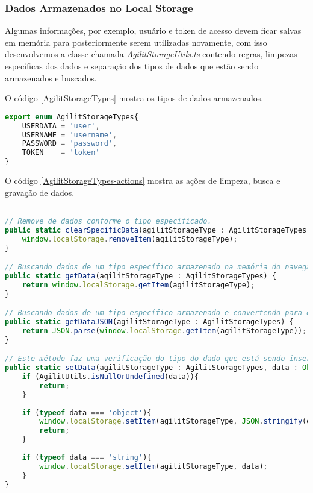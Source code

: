 \subsubsection{Dados Armazenados no Local Storage}
Algumas informações, por exemplo, usuário e token de acesso devem ficar salvas em memória para posteriormente serem utilizadas novamente, com isso desenvolvemos a classe chamada \textit{AgilitStorageUtils.ts} contendo regras, limpezas específicas dos dados e separação dos tipos de dados que estão sendo armazenados e buscados.

O código \ref{AgilitStorageTypes} mostra os tipos de dados armazenados.
\begin{lstlisting}[language=JavaScript, caption={Tipos de dados armazenados}, label={AgilitStorageTypes}]
export enum AgilitStorageTypes{
	USERDATA = 'user',
	USERNAME = 'username',
	PASSWORD = 'password',
	TOKEN    = 'token'
}
\end{lstlisting}

O código \ref{AgilitStorageTypes-actions} mostra as ações de limpeza, busca e gravação de dados.

\begin{lstlisting}[language=JavaScript, caption={Tipos de dados armazenados}, label={AgilitStorageTypes-actions}]

// Remove de dados conforme o tipo especificado.
public static clearSpecificData(agilitStorageType : AgilitStorageTypes) {
	window.localStorage.removeItem(agilitStorageType);
}

// Buscando dados de um tipo específico armazenado na memória do navegador.
public static getData(agilitStorageType : AgilitStorageTypes) {
	return window.localStorage.getItem(agilitStorageType);
}

// Buscando dados de um tipo específico armazenado e convertendo para objeto.
public static getDataJSON(agilitStorageType : AgilitStorageTypes) {
	return JSON.parse(window.localStorage.getItem(agilitStorageType));
}

// Este método faz uma verificação do tipo do dado que está sendo inserido na memória do navegador.
public static setData(agilitStorageType : AgilitStorageTypes, data : Object|Array<any>|string) {
	if (AgilitUtils.isNullOrUndefined(data)){
		return;
	}
	
	if (typeof data === 'object'){
		window.localStorage.setItem(agilitStorageType, JSON.stringify(data));
		return;
	}
	
	if (typeof data === 'string'){
		window.localStorage.setItem(agilitStorageType, data);
	}    
}
\end{lstlisting}

